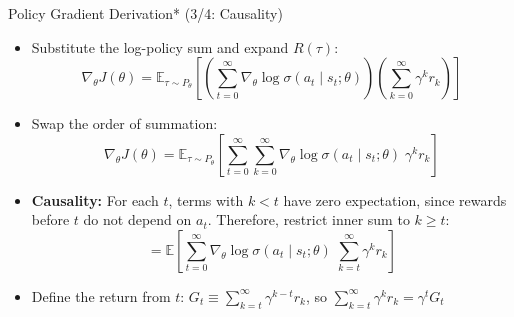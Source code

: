 \documentclass[aspectratio=169]{beamer}
\newcommand{\1}{\mathbf{1}}
\begin{document}
\begin{frame}{Policy Gradient Derivation* (3/4: Causality)}
    \small
    \begin{itemize}
        \item Substitute the log-policy sum and expand $R(\tau)$:
        \[
            \nabla_\theta J(\theta)
            =
            \mathbb{E}_{\tau \sim P_\theta}
            \left[
                \left(
                \sum_{t=0}^{\infty} \nabla_\theta \log \sigma(a_t \mid s_t;\theta)
                \right)
                \left(
                \sum_{k=0}^{\infty} \gamma^k r_k
                \right)
            \right]
        \]
        \item Swap the order of summation:
        \[
            \nabla_\theta J(\theta)
            =
            \mathbb{E}_{\tau \sim P_\theta}
            \left[
                \sum_{t=0}^{\infty}
                \sum_{k=0}^{\infty}
                \nabla_\theta \log \sigma(a_t \mid s_t;\theta)\;
                \gamma^k r_k
            \right]
        \]
        \item \textbf{Causality:} For each $t$, terms with $k < t$ have zero expectation, since rewards before $t$ do not depend on $a_t$. Therefore, restrict inner sum to $k \geq t$:
        \[
            =
            \mathbb{E}
            \left[
                \sum_{t=0}^{\infty}
                \nabla_\theta \log \sigma(a_t \mid s_t;\theta)\;
                \sum_{k=t}^{\infty} \gamma^k r_k
            \right]
        \]
        \item Define the return from $t$: $G_t \equiv \sum_{k=t}^{\infty} \gamma^{k-t} r_k$, so $\sum_{k=t}^{\infty} \gamma^k r_k = \gamma^t G_t$
    \end{itemize}
\end{frame}
    
\end{document}
